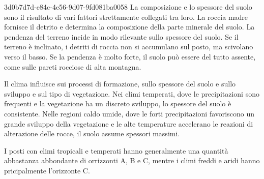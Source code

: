 \documentclass[preview]{standalone}
\begin{document}
\begin{snippet}{3d0b7d7d-e84c-4e56-9d07-9fd081ba0058}
    La composizione e lo spessore del suolo sono il risultato di vari fattori strettamente
    collegati tra loro.
    La roccia madre fornisce il detrito e determina la composizione della parte minerale del suolo.
    La pendenza del terreno incide in modo rilevante sullo spessore del suolo.
    Se il terreno è inclinato, i detriti di roccia non si accumulano sul posto, ma scivolano
    verso il basso.
    Se la pendenza è molto forte, il suolo può essere del tutto assente, come
    sulle pareti rocciose di alta montagna.

    Il clima influisce sui processi di formazione, sullo spessore del suolo e sullo sviluppo e sul tipo di vegetazione.
    Nei climi temperati, dove le precipitazioni sono frequenti e la vegetazione ha un discreto sviluppo,
    lo spessore del suolo è consistente.
    Nelle regioni caldo umide, dove le forti precipitazioni favoriscono un grande sviluppo della vegetazione
    e le alte temperature accelerano le reazioni di alterazione delle rocce, il suolo assume spessori massimi.

    I posti con climi tropicali e temperati hanno generalmente una quantità
    abbastanza abbondante di orrizzonti A, B e C, mentre i climi freddi e aridi hanno pricipalmente
    l'orizzonte C.
\end{snippet}

\end{document}
